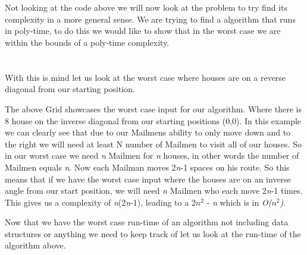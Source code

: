 \documentclass[10pt]{article}
\begin{document}
\\
\\
\newpage
\hfill \break
\break
Not looking at the code above we will now look at the problem to try find its complexity in a more general sense.
We are trying to find a algorithm that runs in poly-time, to do this we would like to show that in the worst case we are within the bounds of a poly-time complexity. 
\\
\\
\\
With this is mind let us look at the worst case where houses are on a reverse diagonal from our starting position.
\hfill \break
\break
{}
\hfill \break
\break
The above Grid showcases the worst case input for our algorithm. Where there is 8 house on the inverse diagonal from our starting positions (0,0). In this example we can clearly see that due to our Mailmens ability to only move down and to the right we will need at least N number of Mailmen to visit all of our houses. 
\hfill \break
\break
So in our worst case we need \textit{n} Mailmen for \textit{n} houses, in other words the number of Mailmen equals \textit{n}. Now each Mailman moves 2\textit{n}-1 spaces on his route. So this means that if we have the worst case input where the houses are on an inverse angle from our start position, we will need \textit{n} Mailmen who each move 2\textit{n}-1 times.
This gives us a complexity of \textit{n}(2\textit{n}-1), leading to a 2\textit{$n^2$} - \textit{n} which is in \textit{O($n^2$)}.

\hfill \break
\break
Now that we have the worst case run-time of an algorithm not including data structures or anything we need to keep track of let us look at the run-time of the algorithm above.

 


\pagebreak
\end{document}
